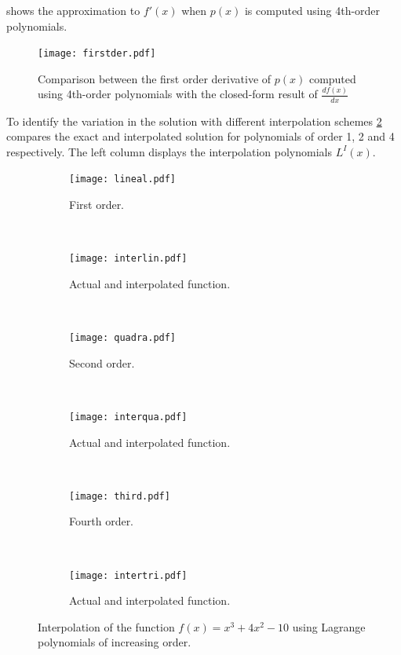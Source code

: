  shows the approximation to $f'(x)$ when $p(x)$ is computed using 4th-order polynomials.

\begin{figure}[H]
  \centering
  \texttt{[image: firstder.pdf]}
  \caption{Comparison between the first order derivative of $p(x)$ computed using 4th-order polynomials with the closed-form result of $\frac{{df(x)}}{{dx}}$}
  \label{fig:first der 1}
\end{figure}

To identify the variation in the solution with different interpolation schemes \cref{fig:several interpol} compares the exact and interpolated solution for polynomials of order 1, 2 and 4 respectively. The left column displays the interpolation polynomials ${{L^I}(x)}$.

\begin{figure}[H]
\centering
	\begin{subfigure}[b]{0.450\textwidth}\qquad
		\texttt{[image: lineal.pdf]}
		\caption{First order. }
	\end{subfigure}\,
%
	\begin{subfigure}[b]{0.450\textwidth}\qquad
		\texttt{[image: interlin.pdf]}
		\caption{Actual and interpolated function.}
	\end{subfigure}\\
%
\centering
	\begin{subfigure}[b]{0.450\textwidth}\qquad
		\texttt{[image: quadra.pdf]}
		\caption{Second order.}
	\end{subfigure}\,
%
	\begin{subfigure}[b]{0.450\textwidth}\qquad
		\texttt{[image: interqua.pdf]}
		\caption{Actual and interpolated function.}
	\end{subfigure}\\
%
\centering
	\begin{subfigure}[b]{0.450\textwidth}\qquad
		\texttt{[image: third.pdf]}
		\caption{Fourth order.}
	\end{subfigure}\,
%
	\begin{subfigure}[b]{0.450\textwidth}\qquad
		\texttt{[image: intertri.pdf]}
		\caption{Actual and interpolated function.}
	\end{subfigure}
\caption{Interpolation of the function $f(x) = {x^3} + 4{x^2} - 10$ using Lagrange polynomials of increasing order.}
\label{fig:several interpol}
\end{figure}

